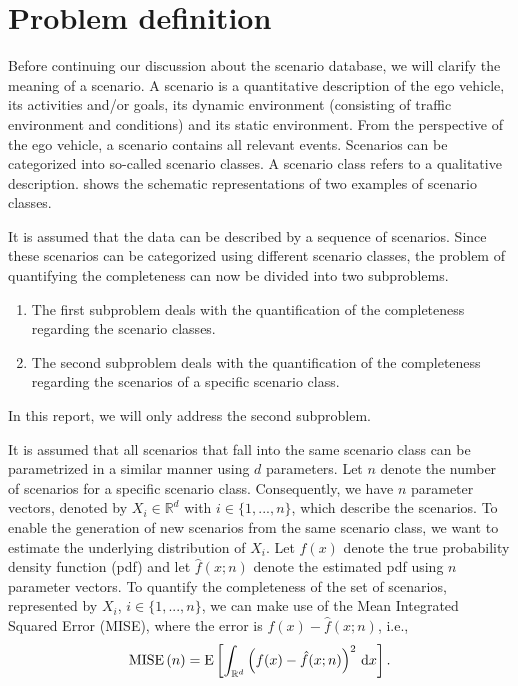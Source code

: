 \documentclass[10pt,final,a4paper,oneside,onecolumn]{article}
\newcommand*{\ud}{\mathrm{\,d}}                                 %
\newcommand{\expectation}[1]{\textup{E} \left[ #1 \right]}
\newcommand{\mise}[1]{\textup{MISE} \left( #1 \right)}
\theoremstyle{plain}\newtheorem{definition}{Definition}[section]    %
\theoremstyle{definition}\newtheorem{example}{Example}[section]     %
\theoremstyle{remark}\newtheorem{remarkenv}{Remark}[section]        %
\begin{document}
\section{Problem definition}
\label{sec:problem}

Before continuing our discussion about the scenario database, we will clarify the meaning of a scenario. A scenario is a quantitative description of the ego vehicle, its activities and/or goals, its dynamic environment (consisting of traffic environment and conditions) and its static environment. From the perspective of the ego vehicle, a scenario contains all relevant events. Scenarios can be categorized into so-called scenario classes. A scenario class refers to a qualitative description.  shows the schematic representations of two examples of scenario classes.

It is assumed that the data can be described by a sequence of scenarios. Since these scenarios can be categorized using different scenario classes, the problem of quantifying the completeness can now be divided into two subproblems.
\begin{enumerate}
	\item The first subproblem deals with the quantification of the completeness regarding the scenario classes.
	\item The second subproblem deals with the quantification of the completeness regarding the scenarios of a specific scenario class.
\end{enumerate}
In this report, we will only address the second subproblem. 

It is assumed that all scenarios that fall into the same scenario class can be parametrized in a similar manner using $d$ parameters. Let $n$ denote the number of scenarios for a specific scenario class. Consequently, we have $n$ parameter vectors, denoted by $X_i \in \mathbb{R}^d$ with $i\in\{1,...,n\}$, which describe the scenarios. To enable the generation of new scenarios from the same scenario class, we want to estimate the underlying distribution of $X_i$. Let $f(x)$ denote the true probability density function (pdf) and let $\hat{f}(x;n)$ denote the estimated pdf using $n$ parameter vectors. To quantify the completeness of the set of scenarios, represented by $X_i$, $i\in\{1,...,n\}$, we can make use of the Mean Integrated Squared Error (MISE), where the error is $f(x)-\hat{f}(x;n)$, i.e.,
\begin{equation} \label{eq:mise}
	\mise{n} = \expectation{ \int_{\mathbb{R}^d} \left(f(x) - \hat{f}(x;n)\right)^2 \ud x}.
\end{equation}
\end{document}
